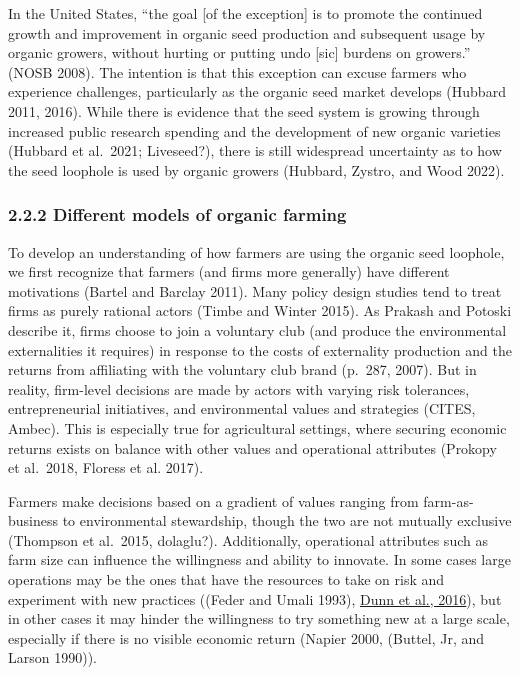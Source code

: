 \documentclass[twoside,12pt,final]{ucthesis-CA2012}
\begin{document}
\begin{ucmainmatter}
In the United States, ``the goal {[}of the exception{]} is to promote the
continued growth and improvement in organic seed production and
subsequent usage by organic growers, without hurting or putting undo
{[}sic{]} burdens on growers.'' (NOSB 2008). The intention is that this
exception can excuse farmers who experience challenges, particularly as
the organic seed market develops (Hubbard 2011, 2016). While there is
evidence that the seed system is growing through increased public
research spending and the development of new organic varieties (Hubbard
et al.~2021; Liveseed?), there is still widespread uncertainty as to how
the seed loophole is used by organic growers (Hubbard, Zystro, and Wood
2022).

\hypertarget{different-models-of-organic-farming}{%
\subsubsection{2.2.2 Different models of organic farming}\label{different-models-of-organic-farming}}

To develop an understanding of how farmers are using the organic seed
loophole, we first recognize that farmers (and firms more generally)
have different motivations (Bartel and Barclay 2011). Many policy design
studies tend to treat firms as purely rational actors (Timbe and Winter
2015). As Prakash and Potoski describe it, \textquotesingle firms choose to join a
voluntary club (and produce the environmental externalities it requires)
in response to the costs of externality production and the returns from
affiliating with the voluntary club brand\textquotesingle{} (p.~287, 2007). But in
reality, firm-level decisions are made by actors with varying risk
tolerances, entrepreneurial initiatives, and environmental values and
strategies (CITES, Ambec). This is especially true for agricultural
settings, where securing economic returns exists on balance with other
values and operational attributes (Prokopy et al.~2018, Floress et al.
2017).

Farmers make decisions based on a gradient of values ranging from
\textquotesingle farm-as-business\textquotesingle{} to \textquotesingle environmental stewardship\textquotesingle, though the two
are not mutually exclusive (Thompson et al.~2015, dolaglu?).
Additionally, operational attributes such as farm size can influence the
willingness and ability to innovate. In some cases large operations may
be the ones that have the resources to take on risk and experiment with
new practices ((Feder and Umali
1993), \href{https://www.zotero.org/google-docs/?broken=rs6XVC}{Dunn et al.,
2016}), but in other
cases it may hinder the willingness to try something new at a large
scale, especially if there is no visible economic return (Napier 2000,
(Buttel, Jr, and Larson
1990)).


\end{ucmainmatter}
\end{document}
